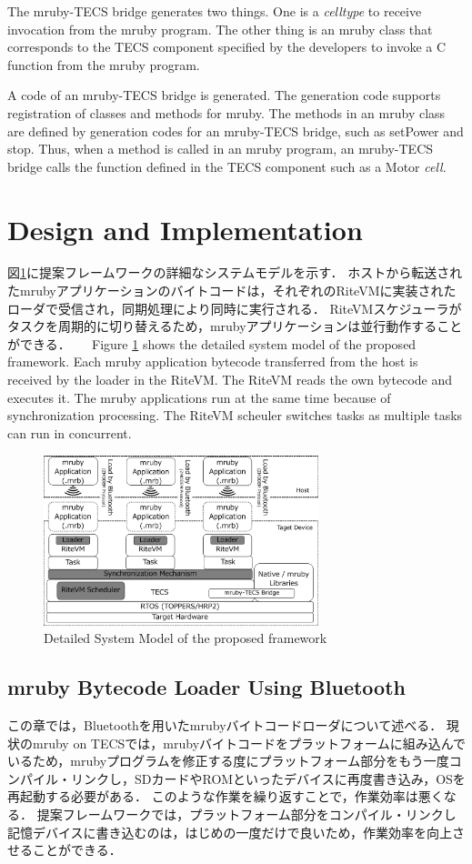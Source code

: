 \documentclass[submit]{ipsj_v2/UTF8/ipsj}
\begin{document}
The mruby-TECS bridge generates two things.
One is a {\it celltype} to receive invocation from the mruby program.
The other thing is an mruby class that corresponds to the TECS component specified by the developers to invoke a C function from the mruby program.

A code of an mruby-TECS bridge is generated.
The generation code supports registration of classes and methods for mruby.
The methods in an mruby class are defined by generation codes for an mruby-TECS bridge, such as setPower and stop.
Thus, when a method is called in an mruby program, an mruby-TECS bridge calls the function defined in the TECS component such as a Motor {\it cell}.

\section{Design and Implementation}
\label{sec:Design and Implementation}
図\ref{fig:system_model}に提案フレームワークの詳細なシステムモデルを示す．
ホストから転送されたmrubyアプリケーションのバイトコードは，それぞれのRiteVMに実装されたローダで受信され，同期処理により同時に実行される．
RiteVMスケジューラがタスクを周期的に切り替えるため，mrubyアプリケーションは並行動作することができる．
　
Figure \ref{fig:system_model} shows the detailed system model of the proposed framework.
Each mruby application bytecode transferred from the host is received by the loader in the RiteVM.
The RiteVM reads the own bytecode and executes it.
The mruby applications run at the same time because of synchronization processing.
The RiteVM scheuler switches tasks as multiple tasks can run in concurrent.

\begin{figure}[t]
    \centering
    \includegraphics[width=8cm,clip]{../EMSOFT2016/figure/system_model.pdf}
    \caption{Detailed System Model of the proposed framework}
    \label{fig:system_model}
\end{figure}

\subsection{mruby Bytecode Loader Using Bluetooth}
\label{sec:mruby bytecode loader using Bluetooth}
この章では，Bluetoothを用いたmrubyバイトコードローダについて述べる．
現状のmruby on TECSでは，mrubyバイトコードをプラットフォームに組み込んでいるため，mrubyプログラムを修正する度にプラットフォーム部分をもう一度コンパイル・リンクし，SDカードやROMといったデバイスに再度書き込み，OSを再起動する必要がある．
このような作業を繰り返すことで，作業効率は悪くなる．
提案フレームワークでは，プラットフォーム部分をコンパイル・リンクし記憶デバイスに書き込むのは，はじめの一度だけで良いため，作業効率を向上させることができる．
\end{document}
